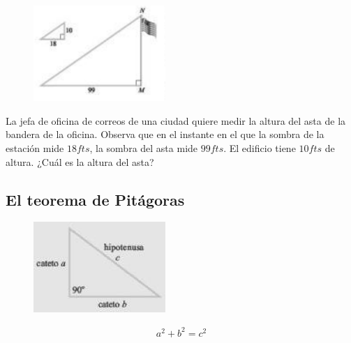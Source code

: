 		\begin{figure}
	\centering
	\includegraphics[width=5cm,keepaspectratio=true]{./trig/trig9448.png}
	\label{fig:9448}
\end{figure}

	\begin{problema}
		\label{exmp:9407}

		La jefa de oficina de correos de una ciudad quiere medir la altura del asta de la bandera de la oficina. Observa que en el instante en el que la sombra de la estación mide $18fts$, la sombra del asta mide $99fts$. El edificio tiene $10fts$ de altura. ¿Cuál es la altura del asta?
	\end{problema}
	

\subsection{El teorema de Pitágoras}
\begin{figure}
	\centering
	\includegraphics[width=5cm,keepaspectratio=true]{./trig/trig94thm.png}
	\label{fig:94thm}
\end{figure}
{}
	\begin{teorema}[Pitágoras]
		\begin{align*}
			a^{2}+b^{2}=c^{2}
		\end{align*}
	\end{teorema}
	

